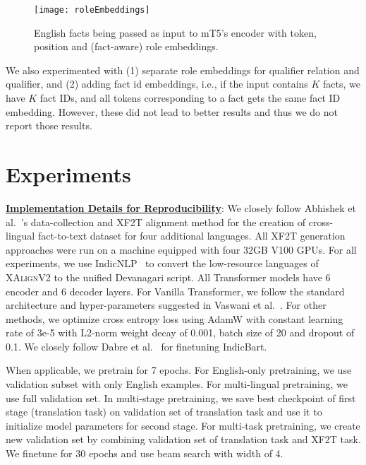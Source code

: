 \documentclass[runningheads]{llncs}
\newcommand{\data}{\textsc{XAlignV2}}
\begin{document}
\begin{figure*}
    \centering
    \texttt{[image: roleEmbeddings]}
    \caption{English facts being passed as input to mT5's encoder with token, position and (fact-aware) role embeddings.}
    \label{fig:roleEmbeddings}
\end{figure*}

We also experimented with (1) separate role embeddings for qualifier relation and qualifier, and (2) adding fact id embeddings, i.e., if the input contains $K$ facts, we have $K$ fact IDs, and all tokens corresponding to a fact gets the same fact ID embedding. However, these did not lead to better results and thus we do not report those results.










\section{Experiments}
\label{sec:experiments}
\noindent\underline{\textbf{Implementation Details for Reproducibility}}: We closely follow Abhishek et al.~\cite{abhishek2022xalign}'s data-collection and XF2T alignment method for the creation of cross-lingual fact-to-text dataset for four additional languages. All XF2T generation approaches were run on a machine equipped with four 32GB V100 GPUs. For all experiments, we use IndicNLP~\cite{kakwani2020indicnlpsuite} to convert the low-resource languages of \data{} to the unified Devanagari script. All Transformer models have 6 encoder and 6 decoder layers. For Vanilla Transformer, we follow the standard architecture and hyper-parameters suggested in Vaswani et al.~\cite{vaswani2017attention}. For other methods,  we optimize cross entropy loss using AdamW with constant learning rate of 3e-5 with L2-norm weight decay of 0.001, batch size of 20 and dropout of 0.1. We closely follow Dabre et al.~\cite{dabre2021indicbart} for finetuning IndicBart.  


When applicable, we pretrain for 7 epochs. For English-only pretraining, we use validation subset with only English examples. For multi-lingual pretraining, we use full validation set. In multi-stage pretraining, we save best checkpoint of first stage (translation task) on validation set of translation task and use it to initialize model parameters for second stage. For multi-task pretraining, we create new validation set by combining validation set of translation task and XF2T task. We finetune for 30 epochs and use beam search with width of 4. 
\end{document}
